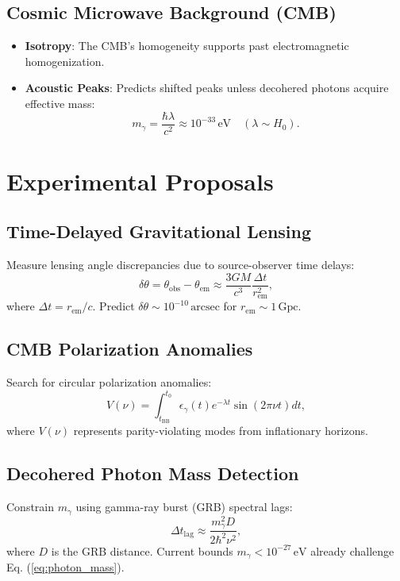 \documentclass{article}
\begin{document}
\subsection{Cosmic Microwave Background (CMB)}
\begin{itemize}
\item \textbf{Isotropy}: The CMB's homogeneity supports past electromagnetic homogenization.
\item \textbf{Acoustic Peaks}: Predicts shifted peaks unless decohered photons acquire effective mass:
\begin{equation}
m_{\gamma} = \frac{\hbar \lambda}{c^2} \approx 10^{-33} \, \text{eV} \quad (\lambda \sim H_0). \label{eq:photon_mass}
\end{equation}
\end{itemize}

\section{Experimental Proposals}
\subsection{Time-Delayed Gravitational Lensing}
Measure lensing angle discrepancies due to source-observer time delays:
\begin{equation}
\delta \theta = \theta_{\text{obs}} - \theta_{\text{em}} \approx \frac{3GM}{c^3} \frac{\Delta t}{r_{\text{em}}^2}, \label{eq:lensing}
\end{equation}
where \( \Delta t = r_{\text{em}}/c \). Predict \( \delta \theta \sim 10^{-10} \, \text{arcsec} \) for \( r_{\text{em}} \sim 1 \, \text{Gpc} \).

\subsection{CMB Polarization Anomalies}
Search for circular polarization anomalies:
\begin{equation}
V(\nu) = \int_{t_{\text{BB}}}^{t_0} \epsilon_{\gamma}(t) e^{-\lambda t} \sin\left(2\pi \nu t \right) dt, \label{eq:polarization}
\end{equation}
where \( V(\nu) \) represents parity-violating modes from inflationary horizons.

\subsection{Decohered Photon Mass Detection}
Constrain \( m_{\gamma} \) using gamma-ray burst (GRB) spectral lags:
\begin{equation}
\Delta t_{\text{lag}} \approx \frac{m_{\gamma}^2 D}{2\hbar^2 \nu^2}, \label{eq:grb}
\end{equation}
where \( D \) is the GRB distance. Current bounds \( m_{\gamma} < 10^{-27} \, \text{eV} \) already challenge Eq. (\ref{eq:photon_mass}).
\end{document}
